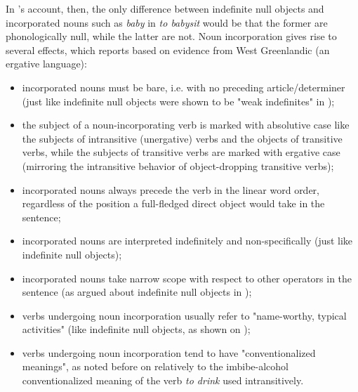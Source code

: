 In \textcite{Marti2015}'s account, then, the only difference between indefinite null objects and incorporated nouns such as \textit{baby} in \textit{to babysit} would be that the former are phonologically null, while the latter are not. Noun incorporation gives rise to several effects, which \textcite[455-456]{Marti2015} reports based on evidence from West Greenlandic (an ergative language):
\begin{itemize}
    \item incorporated nouns must be bare, i.e. with no preceding article/determiner (just like indefinite null objects were shown to be "weak indefinites" in );
    \item the subject of a noun-incorporating verb is marked with absolutive case like the subjects of intransitive (unergative) verbs and the objects of transitive verbs, while the subjects of transitive verbs are marked with ergative case (mirroring the intransitive behavior of object-dropping transitive verbs);
    \item incorporated nouns always precede the verb in the linear word order, regardless of the position a full-fledged direct object would take in the sentence;
    \item incorporated nouns are interpreted indefinitely and non-specifically (just like indefinite null objects);
    \item incorporated nouns take narrow scope with respect to other operators in the sentence (as argued about indefinite null objects in );
    \item verbs undergoing noun incorporation usually refer to "name-worthy, typical activities" (like indefinite null objects, as shown on );
    \item verbs undergoing noun incorporation tend to have "conventionalized meanings", as noted before on  relatively to the imbibe-alcohol conventionalized meaning of the verb \textit{to drink} used intransitively.
\end{itemize}

